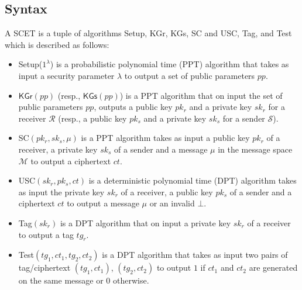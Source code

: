 \documentclass[a4paper,11pt,onecolumn]{elsarticle}
\begin{document}
	\subsection{Syntax} \label{syn}
	 A SCET is a tuple of algorithms \textsf{Setup},  \textsf{KGr}, \textsf{KGs}, \textsf{SC} and \textsf{USC},  \textsf{Tag},  and \textsf{Test} which is described as follows: 
\begin{itemize}
\item \textsf{Setup($1^{\lambda}$)} is a probabilistic polynomial time (PPT) algorithm that takes as input a security parameter $\lambda$ to output a set of public parameters $pp$.
\item $ \textsf{KGr}(pp)$ (resp., $\textsf{KGs}(pp)$) is a PPT algorithm that on input the set of public parameters $pp$, outputs a public key $pk_r$ and a private key $sk_r$ for a receiver $\mathcal{R}$ (resp., a public key $pk_s$ and a private key $sk_s$ for a sender $\mathcal{S}$). 	  
\item	 \textsf{SC}$(pk_r,sk_s,\mu)$ is a PPT algorithm takes as input  a public key $pk_r$ of a receiver, a private key $ sk_s$ of a sender  and a message $\mu$ in the message space  $\mathcal{M}$  to output a  ciphertext $ct$. 
\item   \textsf{USC$(sk_r,pk_s,ct)$} is a deterministic polynomial time (DPT) algorithm takes as input the private key $ sk_r$ of a receiver,  a public key $pk_s$ of a sender  and a ciphertext $ct$ to output a message $\mu$ or an invalid $\bot$. 
\item	\textsf{Tag$(sk_r)$} is a DPT algorithm that on  input a private key  $sk_r $ of a receiver to output a tag $tg_r$.
\item	\textsf{Test$(tg_1, ct_1, tg_2, ct_2)$} is a DPT algorithm that takes as input two pairs of tag/ciphertext  $(tg_1, ct_1)$, $(tg_2, ct_2)$ to output $1$ if $ct_1$ and $ct_2$ are generated on the same message or $0$ otherwise.
\end{itemize}
	

	
	\iffalse
	\begin{figure}
		\medskip
		\centering
		\smallskip
		\small\addtolength{\tabcolsep}{10pt}
		\frame{\texttt{[image: gameIND.png]}}
		\caption{\textsf{IND-CPA} Game against Type-1 Adversary.}
		\label{fig1}
	\end{figure}
	
	\fi
	
	
\end{document}
